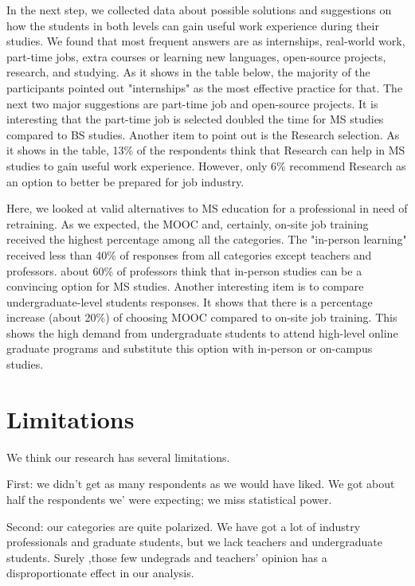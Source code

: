 \documentclass{sigchi}
\begin{document}
In the next step, we collected data about possible solutions and suggestions on how the students in both levels can gain useful work experience during their studies. We found that most frequent answers are as internships, real-world work, part-time jobs, extra courses or learning new languages, open-source projects, research, and studying. As it shows in the table below, the majority of the participants pointed out "internships" as the most effective practice for that. The next two major suggestions are part-time job and open-source projects. It is interesting that the part-time job is selected doubled the time for MS studies compared to BS studies. Another item to point out is the Research selection. As it shows in the table, 13\% of the respondents think that Research can help in MS studies to gain useful work experience. However, only 6\% recommend Research as an option to better be prepared for job industry.

Here, we looked at valid alternatives to MS education for a professional in need of retraining. As we expected, the MOOC and, certainly, on-site job training received the highest percentage among all the categories. The "in-person learning" received less than 40\% of responses from all categories except teachers and professors. about 60\% of professors think that in-person studies can be a convincing option for MS studies. Another interesting item is to compare undergraduate-level students responses. It shows that there is a percentage increase (about 20\%) of choosing MOOC compared to on-site job training. This shows the high demand from undergraduate students to attend high-level online graduate programs and substitute this option with in-person or on-campus studies.

\section{Limitations}
 We think our research has several limitations.\newline

First: we didn't get as many respondents as we would have liked. We got about half the respondents we' were expecting; we miss statistical power.\newline

Second: our categories are quite polarized. We have got a lot of industry professionals and graduate students, but we lack teachers and undergraduate students. Surely ,those few undegrads and teachers' opinion has a disproportionate effect in our analysis.\newline
\end{document}
